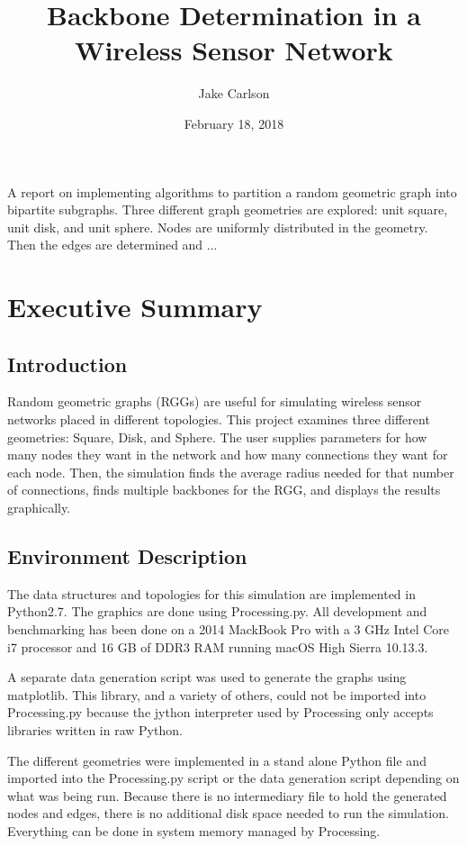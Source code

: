 \documentclass{article}
\begin{document}
\title{Backbone Determination in a Wireless Sensor Network}
\author{Jake Carlson}
\date{February 18, 2018}
\maketitle

\abstract
A report on implementing algorithms to partition a random geometric graph into bipartite subgraphs. Three different graph geometries are explored: unit square, unit disk, and unit sphere. Nodes are uniformly distributed in the geometry. Then the edges are determined and ...
\newpage

\tableofcontents
\newpage

\section{Executive Summary}

    \subsection{Introduction}
    Random geometric graphs (RGGs) are useful for simulating wireless sensor networks placed in different topologies. This project examines three different geometries: Square, Disk, and Sphere. The user supplies parameters for how many nodes they want in the network and how many connections they want for each node. Then, the simulation finds the average radius needed for that number of connections, finds multiple backbones for the RGG, and displays the results graphically.

    \subsection{Environment Description}
    The data structures and topologies for this simulation are implemented in Python2.7. The graphics are done using Processing.py. All development and benchmarking has been done on a 2014 MackBook Pro with a 3 GHz Intel Core i7 processor and 16 GB of DDR3 RAM running macOS High Sierra 10.13.3.
    \par
    A separate data generation script was used to generate the graphs using matplotlib. This library, and a variety of others, could not be imported into Processing.py because the jython interpreter used by Processing only accepts libraries written in raw Python.
    \par
    The different geometries were implemented in a stand alone Python file and imported into the Processing.py script or the data generation script depending on what was being run. Because there is no intermediary file to hold the generated nodes and edges, there is no additional disk space needed to run the simulation. Everything can be done in system memory managed by Processing.
\end{document}
